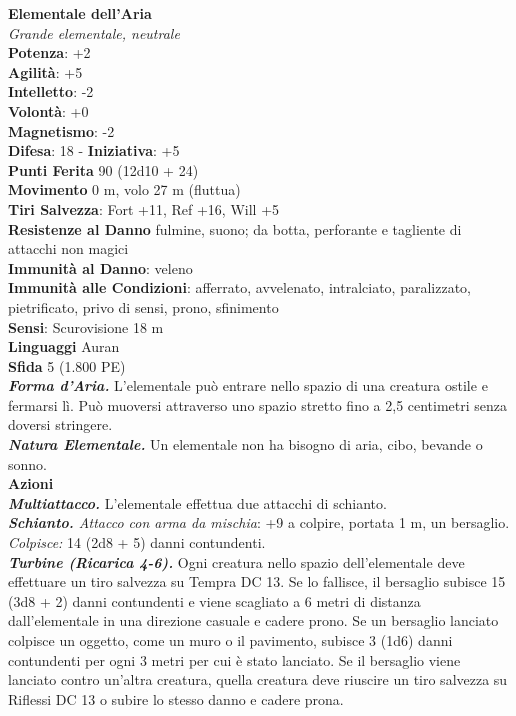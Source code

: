 \begin{multicols}{2}
\medskip\textbf{Elementale dell'Aria}\\
\emph{Grande elementale, neutrale}\\
\textbf{Potenza}: +2\\
\textbf{Agilità}: +5\\
\textbf{Intelletto}: -2\\
\textbf{Volontà}: +0\\
\textbf{Magnetismo}: -2\\
\textbf{Difesa}: 18 - \textbf{Iniziativa}: +5\\
\textbf{Punti Ferita} 90 (12d10 + 24)\\
\textbf{Movimento} 0 m, volo 27 m (fluttua)\\
\textbf{Tiri Salvezza}: Fort +11, Ref +16, Will +5\\
\textbf{Resistenze al Danno} fulmine, suono; da botta, perforante e tagliente di attacchi non magici\\
\textbf{Immunità al Danno}: veleno\\
\textbf{Immunità alle Condizioni}: afferrato, avvelenato, intralciato, paralizzato, pietrificato, privo di sensi, prono, sfinimento\\
\textbf{Sensi}: Scurovisione 18 m\\
\textbf{Linguaggi} Auran\\
\textbf{Sfida} 5 (1.800 PE)\smallskip\\
\emph{\textbf{Forma d'Aria.}} L'elementale può entrare nello spazio di una creatura ostile e fermarsi lì. Può muoversi attraverso uno spazio stretto fino a 2,5 centimetri senza doversi stringere.\\
\emph{\textbf{Natura Elementale.}} Un elementale non ha bisogno di aria, cibo, bevande o sonno.\\
\smallskip\textbf{Azioni}\\
\emph{\textbf{Multiattacco.}} L'elementale effettua due attacchi di schianto.\\
\emph{\textbf{Schianto.} Attacco con arma da mischia}: +9 a colpire, portata 1 m, un bersaglio.\\
\emph{Colpisce:} 14 (2d8 + 5) danni contundenti.\\
\emph{\textbf{Turbine (Ricarica 4-6).}} Ogni creatura nello spazio dell'elementale deve effettuare un tiro salvezza su Tempra DC 13. Se lo fallisce, il bersaglio subisce 15 (3d8 + 2) danni contundenti e viene scagliato a 6 metri di distanza dall'elementale in una direzione casuale e cadere prono. Se un bersaglio lanciato colpisce un oggetto, come un muro o il pavimento, subisce 3 (1d6) danni contundenti per ogni 3 metri per cui è stato lanciato. Se il bersaglio viene lanciato contro un'altra creatura, quella creatura deve riuscire un tiro salvezza su Riflessi DC 13 o subire lo stesso danno e cadere prona.\\

\end{multicols}
